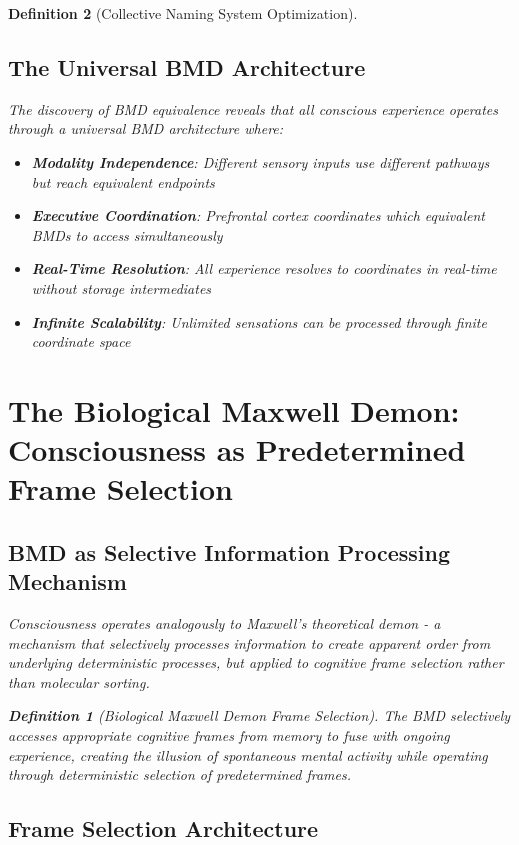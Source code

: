 \documentclass[12pt]{article}
\newtheorem{definition}{Definition}
\begin{document}
\begin{definition}[Collective Naming System Optimization]
\subsection{The Universal BMD Architecture}

The discovery of BMD equivalence reveals that all conscious experience operates through a universal BMD architecture where:

\begin{itemize}
\item \textbf{Modality Independence}: Different sensory inputs use different pathways but reach equivalent endpoints
\item \textbf{Executive Coordination}: Prefrontal cortex coordinates which equivalent BMDs to access simultaneously
\item \textbf{Real-Time Resolution}: All experience resolves to coordinates in real-time without storage intermediates
\item \textbf{Infinite Scalability}: Unlimited sensations can be processed through finite coordinate space
\end{itemize}

\section{The Biological Maxwell Demon: Consciousness as Predetermined Frame Selection}

\subsection{BMD as Selective Information Processing Mechanism}

Consciousness operates analogously to Maxwell's theoretical demon - a mechanism that selectively processes information to create apparent order from underlying deterministic processes, but applied to cognitive frame selection rather than molecular sorting.

\begin{definition}[Biological Maxwell Demon Frame Selection]
The BMD selectively accesses appropriate cognitive frames from memory to fuse with ongoing experience, creating the illusion of spontaneous mental activity while operating through deterministic selection of predetermined frames.
\end{definition}

\subsection{Frame Selection Architecture}


\end{definition}
\end{document}
